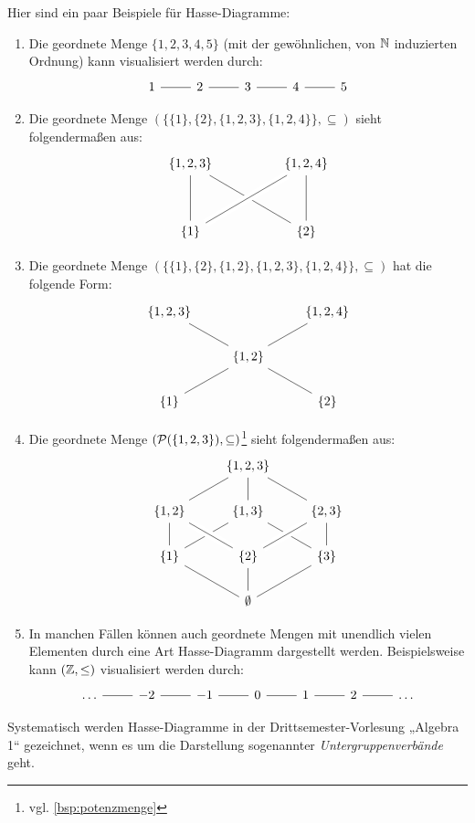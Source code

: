\begin{bsp} \label{bsp:hasse}
    Hier sind ein paar Beispiele für Hasse-Diagramme:
    \begin{enumerate}
        \item Die geordnete Menge $\{1,2,3,4,5\}$ (mit der gewöhnlichen, von $\mathbb N$ induzierten Ordnung) kann visualisiert werden durch:
        \[\begin{tikzcd}
            1 \ar[r, dash] & 2 \ar[r, dash] & 3 \ar[r, dash] & 4 \ar[r, dash] & 5
        \end{tikzcd}\]
        \item Die geordnete Menge $(\{\{1\},\{2\},\{1,2,3\},\{1,2,4\}\},\subseteq)$ sieht folgendermaßen aus:
        \[\begin{tikzcd}
            \{1,2,3\} && \{1,2,4\} \\
            && \\
            \{1\} \ar[uu, dash] && \{2\} \ar[uu, dash] \ar[lluu, dash] \ar[from=ll, to=uu, dash, crossing over]
        \end{tikzcd}\]
        \item Die geordnete Menge $(\{\{1\},\{2\},\{1,2\},\{1,2,3\},\{1,2,4\}\},\subseteq)$ hat die folgende Form:
        \[\begin{tikzcd}
            \{1,2,3\} && \{1,2,4\} \\
            & \{1,2\} \ar[lu, dash] \ar[ru, dash] & \\
            \{1\} \ar[ru, dash] && \{2\} \ar[ul, dash]
        \end{tikzcd}\]
        \item Die geordnete Menge $(\mathcal P(\{1,2,3\}),\subseteq)$\footnote{vgl. \cref{bsp:potenzmenge}} sieht folgendermaßen aus:
        \[ \begin{tikzcd}
            & \{ 1,2,3 \} & \\
            \{ 1,2 \} \ar[ru, dash] & \{ 1,3\} \ar[u, dash] \ar[from = rd, dash] & \{ 2,3 \} \ar[lu, dash] \\
            \{ 1 \} \ar[u, dash] \ar[ru, dash] & \{ 2 \} \ar[lu, crossing over, dash] \ar[ru, crossing over, dash] & \{ 3 \} \ar[u, dash]\\
            & \emptyset \ar[lu, dash] \ar[ru, dash] \ar[u, dash] &
        \end{tikzcd} \]
        \item In manchen Fällen können auch geordnete Mengen mit unendlich vielen Elementen durch eine Art Hasse-Diagramm dargestellt werden. Beispielsweise kann $(\mathbb Z,\le)$ visualisiert werden durch:
        \[\begin{tikzcd}
            \dots \ar[r, dash] & -2 \ar[r, dash] & -1 \ar[r, dash] & 0 \ar[r, dash] & 1 \ar[r, dash] & 2 \ar[r, dash] & \dots
        \end{tikzcd}\]
    \end{enumerate}
    Systematisch werden Hasse-Diagramme in der Drittsemester-Vorlesung „Algebra 1“ gezeichnet, wenn es um die Darstellung sogenannter \emph{Untergruppenverbände} geht.
\end{bsp}


